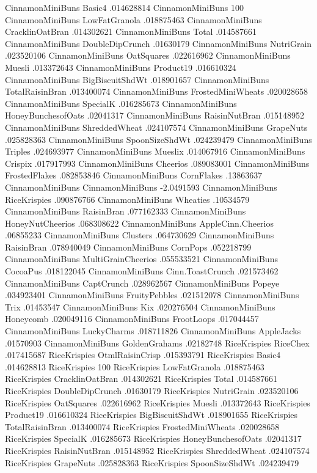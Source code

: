 CinnamonMiniBuns	Basic4	.014628814
CinnamonMiniBuns	100%
CinnamonMiniBuns	LowFatGranola	.018875463
CinnamonMiniBuns	CracklinOatBran	.014302621
CinnamonMiniBuns	Total	.014587661
CinnamonMiniBuns	DoubleDipCrunch	.01630179
CinnamonMiniBuns	NutriGrain	.023520106
CinnamonMiniBuns	OatSquares	.022616962
CinnamonMiniBuns	Muesli	.013372643
CinnamonMiniBuns	Product19	.016610324
CinnamonMiniBuns	BigBiscuitShdWt	.018901657
CinnamonMiniBuns	TotalRaisinBran	.013400074
CinnamonMiniBuns	FrostedMiniWheats	.020028658
CinnamonMiniBuns	SpecialK	.016285673
CinnamonMiniBuns	HoneyBunchesofOats	.02041317
CinnamonMiniBuns	RaisinNutBran	.015148952
CinnamonMiniBuns	ShreddedWheat	.024107574
CinnamonMiniBuns	GrapeNuts	.025828363
CinnamonMiniBuns	SpoonSizeShdWt	.024239479
CinnamonMiniBuns	Triples	.024693977
CinnamonMiniBuns	Mueslix	.014067916
CinnamonMiniBuns	Crispix	.017917993
CinnamonMiniBuns	Cheerios	.089083001
CinnamonMiniBuns	FrostedFlakes	.082853846
CinnamonMiniBuns	CornFlakes	.13863637
CinnamonMiniBuns	CinnamonMiniBuns	-2.0491593
CinnamonMiniBuns	RiceKrispies	.090876766
CinnamonMiniBuns	Wheaties	.10534579
CinnamonMiniBuns	RaisinBran	.077162333
CinnamonMiniBuns	HoneyNutCheerios	.068308622
CinnamonMiniBuns	AppleCinn.Cheerios	.06855233
CinnamonMiniBuns	Clusters	.064730629
CinnamonMiniBuns	RaisinBran	.078940049
CinnamonMiniBuns	CornPops	.052218799
CinnamonMiniBuns	MultiGrainCheerios	.055533521
CinnamonMiniBuns	CocoaPus	.018122045
CinnamonMiniBuns	Cinn.ToastCrunch	.021573462
CinnamonMiniBuns	CaptCrunch	.028962567
CinnamonMiniBuns	Popeye	.034923401
CinnamonMiniBuns	FruityPebbles	.021512078
CinnamonMiniBuns	Trix	.01453547
CinnamonMiniBuns	Kix	.020276504
CinnamonMiniBuns	Honeycomb	.020049116
CinnamonMiniBuns	FrootLoops	.017044457
CinnamonMiniBuns	LuckyCharms	.018711826
CinnamonMiniBuns	AppleJacks	.01570903
CinnamonMiniBuns	GoldenGrahams	.02182748
RiceKrispies	RiceChex	.017415687
RiceKrispies	OtmlRaisinCrisp	.015393791
RiceKrispies	Basic4	.014628813
RiceKrispies	100%
RiceKrispies	LowFatGranola	.018875463
RiceKrispies	CracklinOatBran	.014302621
RiceKrispies	Total	.014587661
RiceKrispies	DoubleDipCrunch	.01630179
RiceKrispies	NutriGrain	.023520106
RiceKrispies	OatSquares	.022616962
RiceKrispies	Muesli	.013372643
RiceKrispies	Product19	.016610324
RiceKrispies	BigBiscuitShdWt	.018901655
RiceKrispies	TotalRaisinBran	.013400074
RiceKrispies	FrostedMiniWheats	.020028658
RiceKrispies	SpecialK	.016285673
RiceKrispies	HoneyBunchesofOats	.02041317
RiceKrispies	RaisinNutBran	.015148952
RiceKrispies	ShreddedWheat	.024107574
RiceKrispies	GrapeNuts	.025828363
RiceKrispies	SpoonSizeShdWt	.024239479
